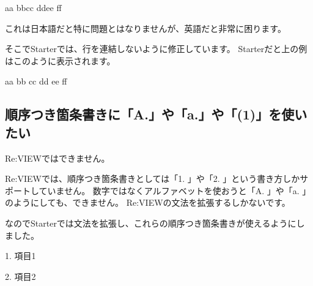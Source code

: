 \starterresult

\begin{starteritemize}
\item aa bbcc ddee ff
\end{starteritemize}

\endstarterresult

これは日本語だと特に問題とはなりませんが、英語だと非常に困ります。

そこでStarterでは、行を連結しないように修正しています。
Starterだと上の例はこのように表示されます。

\begin{starterprogram}\end{starterprogram}
\noindent
{}

\starterresult

\begin{starteritemize}
\item aa bb
   cc dd
   ee ff
\end{starteritemize}

\endstarterresult

\subsection*{順序つき箇条書きに「A.」や「a.」や「(1)」を使いたい}
\label{sec:2-2-2}

Re:VIEWではできません。

Re:VIEWでは、順序つき箇条書きとしては「1. 」や「2. 」という書き方しかサポートしていません。
数字ではなくアルファベットを使おうと「A. 」や「a. 」のようにしても、できません。
Re:VIEWの文法を拡張するしかないです。

なのでStarterでは文法を拡張し、これらの順序つき箇条書きが使えるようにしました。

\begin{starterprogram}\end{starterprogram}
\noindent
{}

\starterresult

\begin{starterenumerate}
\item[1.] 項目1
\item[2.] 項目2
\end{starterenumerate}


